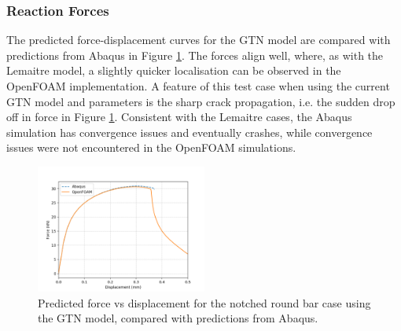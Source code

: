 \documentclass[sn-mathphys,Numbered]{sn-jnl}%
\begin{document}
\subsubsection{Reaction Forces}
The predicted force-displacement curves for the GTN model are compared with predictions from Abaqus in Figure \ref{fig:axi_GTN_forceDisp}.
The forces align well, where, as with the Lemaitre model, a slightly quicker localisation can be observed in the OpenFOAM implementation.
A feature of this test case when using the current GTN model and parameters is the sharp crack propagation, i.e. the sudden drop off in force in Figure \ref{fig:axi_GTN_forceDisp}.
Consistent with the Lemaitre cases, the Abaqus simulation has convergence issues and eventually crashes, while convergence issues were not encountered in the OpenFOAM simulations.
\begin{figure}[htb]
\begin{center}
	\includegraphics[width=0.5\textwidth]{./Figures/GTNCompare/forceDispGTN.jpg}
	\caption{Predicted force vs displacement for the notched round bar case using the GTN model, compared with predictions from Abaqus.}
	\label{fig:axi_GTN_forceDisp}
\end{center}
\end{figure}

\end{document}
